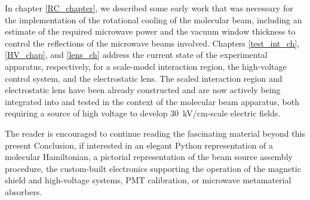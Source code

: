 In chapter \ref{RC_chapter}, we described some early work that was necessary for
the implementation of the rotational cooling of the molecular beam, including an
estimate of the required microwave power and the vacuum window thickness to
control the reflections of the microwave beams involved. Chapters
\ref{test_int_ch}, \ref{HV_chap}, and \ref{lens_ch} address the current state of
the experimental apparatus, respectively, for a scale-model interaction region,
the high-voltage control system, and the electrostatic lens. The scaled
interaction region and electrostatic lens have been already constructed and are
now actively being integrated into and tested in the context of the molecular
beam apparatus, both requiring a source of high voltage to develop
30~kV/cm-scale electric fields.

The reader is encouraged to continue reading the fascinating material beyond
this present Conclusion, if interested in an elegant Python representation of a
molecular Hamiltonian, a pictorial representation of the beam source assembly
procedure, the custom-built electronics supporting the operation of the magnetic
shield and high-voltage systems, \gls{PMT} calibration, or microwave
metamaterial absorbers.
